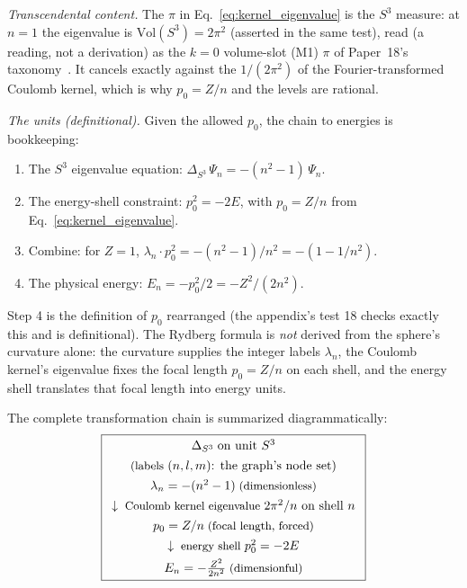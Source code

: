\documentclass[aps,pra,twocolumn,superscriptaddress,longbibliography]{revtex4-2}
\begin{document}
\emph{Transcendental content.} The $\pi$ in Eq.~\eqref{eq:kernel_eigenvalue} is the $S^3$ measure: at $n = 1$ the eigenvalue is $\mathrm{Vol}(S^3) = 2\pi^2$ (asserted in the same test), read (a reading, not a derivation) as the $k = 0$ volume-slot (M1) $\pi$ of Paper~18's taxonomy~\cite{loutey_paper18}. It cancels exactly against the $1/(2\pi^2)$ of the Fourier-transformed Coulomb kernel, which is why $p_0 = Z/n$ and the levels are rational.

\textit{The units (definitional).} Given the allowed $p_0$, the chain to energies is bookkeeping:

\begin{enumerate}
\item The $S^3$ eigenvalue equation: $\Delta_{S^3}\,\Psi_n = -(n^2 - 1)\,\Psi_n$.
\item The energy-shell constraint: $p_0^2 = -2E$, with $p_0 = Z/n$ from Eq.~\eqref{eq:kernel_eigenvalue}.
\item Combine: for $Z = 1$, $\lambda_n \cdot p_0^2 = -(n^2 - 1)/n^2 = -(1 - 1/n^2)$.
\item The physical energy: $E_n = -p_0^2/2 = -Z^2/(2n^2)$.
\end{enumerate}

Step 4 is the definition of $p_0$ rearranged (the appendix's test 18 checks exactly this and is definitional). The Rydberg formula is \textit{not} derived from the sphere's curvature alone: the curvature supplies the integer labels $\lambda_n$, the Coulomb kernel's eigenvalue fixes the focal length $p_0 = Z/n$ on each shell, and the energy shell translates that focal length into energy units.

The complete transformation chain is summarized diagrammatically:
\begin{equation}
\boxed{
\begin{array}{c}
\Delta_{S^3} \;\text{on unit } S^3 \\[4pt]
\text{\small (labels } (n,l,m)\text{: the graph's node set)}\\[4pt]
\lambda_n = -(n^2 - 1) \;\text{\small (dimensionless)}\\[4pt]
\downarrow \;\text{\small Coulomb kernel eigenvalue } 2\pi^2/n \text{ on shell } n\\[4pt]
p_0 = Z/n \;\text{\small (focal length, forced)}\\[4pt]
\downarrow \;\text{\small energy shell } p_0^2 = -2E\\[4pt]
E_n = -\frac{Z^2}{2n^2} \;\text{\small (dimensionful)}
\end{array}
}
\label{eq:chain}
\end{equation}
\end{document}

